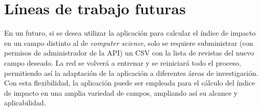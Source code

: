 


\section{Líneas de trabajo futuras}
En un futuro, si se desea utilizar la aplicación para calcular el índice de impacto en un campo distinto al de \textit{computer science}, solo se requiere subministrar (con permisos de administrador de la API) un CSV con la lista de revistas del nuevo campo deseado. La red se volverá a entrenar y se reiniciará todo el proceso, permitiendo así la adaptación de la aplicación a diferentes áreas de investigación. Con esta flexibilidad, la aplicación puede ser empleada para el cálculo del índice de impacto en una amplia variedad de campos, ampliando así su alcance y aplicabilidad.